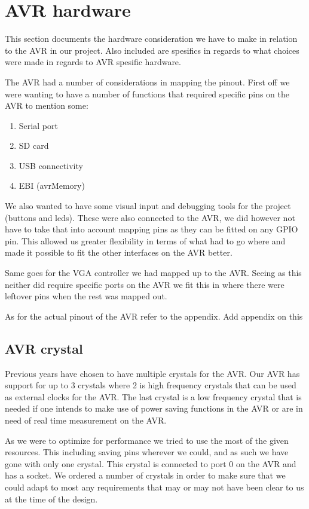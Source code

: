 \section{AVR hardware}

This section documents the hardware consideration we have to make in relation to the AVR in our project. Also included are spesifics in regards to what choices were made in regards to AVR spesific hardware.

The AVR had a number of considerations in mapping the pinout. First off we were wanting to have a number of functions that required specific pins on the AVR to mention some:

\begin{enumerate}
\item Serial port
\item SD card 
\item USB connectivity
\item EBI (avrMemory)
\end{enumerate}

We also wanted to have some visual input and debugging tools for the project (buttons and leds). These were also connected to the AVR, we did however not have to take that into account mapping pins as they can be fitted on any GPIO pin. This allowed us greater flexibility in terms of what had to go where and made it possible to fit the other interfaces on the AVR better.

Same goes for the VGA controller we had mapped up to the AVR. Seeing as this neither did require specific ports on the AVR we fit this in where there were leftover pins when the rest was mapped out.

As for the actual pinout of the AVR refer to the appendix.
\TODO Add appendix on this

\subsection{AVR crystal}

Previous years have chosen to have multiple crystals for the AVR. Our AVR has support for up to 3 crystals where 2 is high frequency crystals that can be used as external clocks for the AVR. The last crystal is a low frequency crystal that is needed if one intends to make use of power saving functions in the AVR or are in need of real time measurement on the AVR.

As we were to optimize for performance we tried to use the most of the given resources. This including saving pins wherever we could, and as such we have gone with only one crystal. This crystal is connected to port 0 on the AVR and has a socket. We ordered a number of crystals in order to make sure that we could adapt to most any requirements that may or may not have been clear to us at the time of the design.


